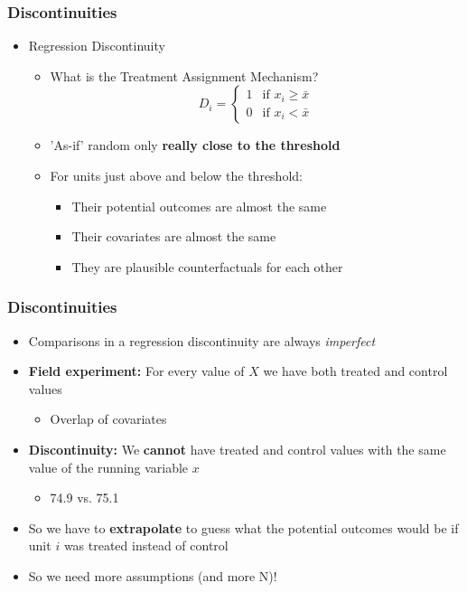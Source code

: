 \documentclass[xcolor=x11names,compress]{beamer}\usepackage[]{graphicx}\usepackage[]{color}
\renewcommand{\(}{\begin{columns}}
\renewcommand{\)}{\end{columns}}
\newcommand{\<}[1]{\begin{column}{#1}}
\renewcommand{\>}{\end{column}}
\begin{document}
\begin{frame}
\frametitle{Discontinuities}
\begin{itemize}
\item Regression Discontinuity
\begin{itemize}
\item What is the Treatment Assignment Mechanism?
\[
D_i=
\begin{cases}
1 & \text{if }x_i \geq \bar{x} \\
0 & \text{if }x_i < \bar{x}
\end{cases}
\]
\pause
\item 'As-if' random only \textbf{really close to the threshold}
\pause
\item For units just above and below the threshold:
\begin{itemize}
\item Their potential outcomes are almost the same
\pause
\item Their covariates are almost the same
\pause
\item They are plausible counterfactuals for each other
\end{itemize}
\end{itemize}
\end{itemize}
\end{frame}


\begin{frame}
\frametitle{Discontinuities}
\begin{itemize}
\item Comparisons in a regression discontinuity are always \textit{imperfect}
\pause
\item \textbf{Field experiment:} For every value of $X$ we have both treated and control values
\begin{itemize}
\item Overlap of covariates
\end{itemize}
\pause
\item \textbf{Discontinuity:} We \textbf{cannot} have treated and control values with the same value of the running variable $x$
\begin{itemize}
\item 74.9 vs. 75.1
\end{itemize}
\pause
\item So we have to \textbf{extrapolate} to guess what the potential outcomes would be if unit $i$ was treated instead of control
\pause
\item So we need more assumptions (and more N)!
\end{itemize}
\end{frame}
\end{document}
